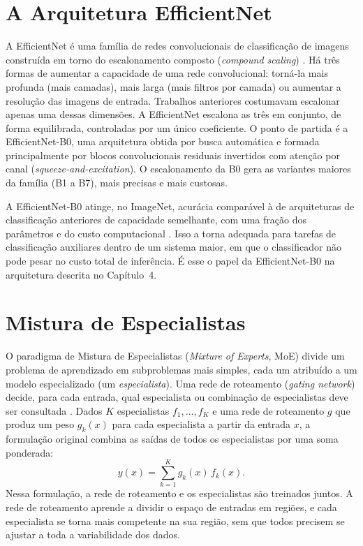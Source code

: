 \section{A Arquitetura EfficientNet}
\label{sec:efficientnet}

A EfficientNet é uma família de redes convolucionais de classificação de imagens construída em torno do escalonamento composto (\textit{compound scaling}) \cite{tan2019efficientnet}. Há três formas de aumentar a capacidade de uma rede convolucional: torná-la mais profunda (mais camadas), mais larga (mais filtros por camada) ou aumentar a resolução das imagens de entrada. Trabalhos anteriores costumavam escalonar apenas uma dessas dimensões. A EfficientNet escalona as três em conjunto, de forma equilibrada, controladas por um único coeficiente. O ponto de partida é a EfficientNet-B0, uma arquitetura obtida por busca automática e formada principalmente por blocos convolucionais residuais invertidos com atenção por canal (\textit{squeeze-and-excitation}). O escalonamento da B0 gera as variantes maiores da família (B1 a B7), mais precisas e mais custosas.

A EfficientNet-B0 atinge, no ImageNet, acurácia comparável à de arquiteturas de classificação anteriores de capacidade semelhante, com uma fração dos parâmetros e do custo computacional \cite{tan2019efficientnet}. Isso a torna adequada para tarefas de classificação auxiliares dentro de um sistema maior, em que o classificador não pode pesar no custo total de inferência. É esse o papel da EfficientNet-B0 na arquitetura descrita no Capítulo~4.

\section{Mistura de Especialistas}
\label{sec:mistura-especialistas}

O paradigma de Mistura de Especialistas (\textit{Mixture of Experts}, MoE) divide um problema de aprendizado em subproblemas mais simples, cada um atribuído a um modelo especializado (um \textit{especialista}). Uma rede de roteamento (\textit{gating network}) decide, para cada entrada, qual especialista ou combinação de especialistas deve ser consultada \cite{jacobs1991adaptive}. Dados $K$ especialistas $f_1, \ldots, f_K$ e uma rede de roteamento $g$ que produz um peso $g_k(x)$ para cada especialista a partir da entrada $x$, a formulação original combina as saídas de todos os especialistas por uma soma ponderada:
\begin{equation}
    y(x) = \sum_{k=1}^{K} g_k(x) \, f_k(x).
    \label{eq:moe-soft}
\end{equation}
Nessa formulação, a rede de roteamento e os especialistas são treinados juntos. A rede de roteamento aprende a dividir o espaço de entradas em regiões, e cada especialista se torna mais competente na sua região, sem que todos precisem se ajustar a toda a variabilidade dos dados.


